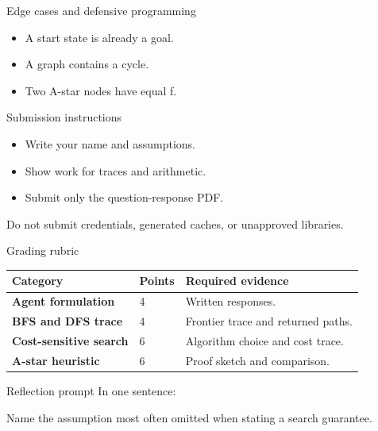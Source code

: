 \documentclass[aspectratio=169,11pt]{beamer}
\begin{document}
\begin{frame}{Edge cases and defensive programming}
\small
\begin{itemize}
  \item A start state is already a goal.
  \item A graph contains a cycle.
  \item Two A-star nodes have equal f.
\end{itemize}
\end{frame}

\begin{frame}{Submission instructions}
\small
\begin{itemize}
  \item Write your name and assumptions.
  \item Show work for traces and arithmetic.
  \item Submit only the question-response PDF.
\end{itemize}
\vspace{0.2cm}
\alert{Do not submit credentials, generated caches, or unapproved libraries.}
\end{frame}

\begin{frame}{Grading rubric}
\scriptsize
\begin{tabularx}{\textwidth}{>{\bfseries}p{} p{} X}
\toprule
Category & Points & Required evidence \\
\midrule
Agent formulation & 4 & Written responses. \\
BFS and DFS trace & 4 & Frontier trace and returned paths. \\
Cost-sensitive search & 6 & Algorithm choice and cost trace. \\
A-star heuristic & 6 & Proof sketch and comparison. \\
\bottomrule
\end{tabularx}
\end{frame}

\begin{frame}{Reflection prompt}
In one sentence:

Name the assumption most often omitted when stating a search guarantee.
\end{frame}
\end{document}
